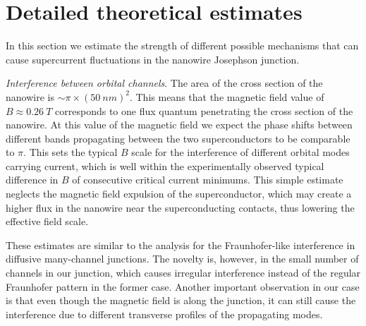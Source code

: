 \documentclass[english, aps,prb,showpacs,preprintnumber,amsmath,amssymb,superscriptaddress,reprint]{revtex4-1}
\begin{document}
\section{Detailed theoretical estimates}
In this section we estimate the strength of different possible mechanisms that can cause supercurrent fluctuations in the nanowire Josephson junction.

\textit{Interference between orbital channels}.
The area of the cross section of the nanowire is $\sim \pi \times (\SI{50}{nm})^2$. This means that the magnetic field value of $B \approx \SI{0.26}{T}$ corresponds to one flux quantum penetrating the cross section of the nanowire.
At this value of the magnetic field we expect the phase shifts between different bands propagating between the two superconductors to be comparable to $\pi$.
This sets the typical $B$ scale for the interference of different orbital modes carrying current, which is well within the experimentally observed typical difference in $B$ of consecutive critical current minimums.
This simple estimate neglects the magnetic field expulsion of the superconductor, which may create a higher flux in the nanowire near the superconducting contacts, thus lowering the effective field scale.

These estimates are similar to the analysis for the Fraunhofer-like interference in diffusive many-channel junctions\cite{Cuevas2007}. The novelty is, however, in the small number of channels in our junction, which causes irregular interference instead of the regular Fraunhofer pattern in the former case. Another important observation in our case is that even though the magnetic field is along the junction, it can still cause the interference due to different transverse profiles of the propagating modes.\\
\end{document}
